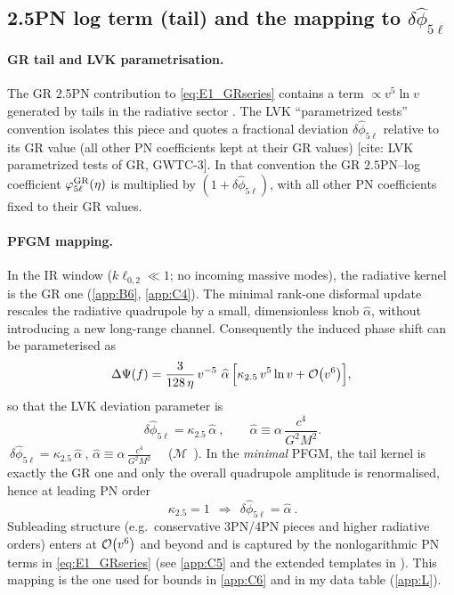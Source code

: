 \documentclass{iopjournal}
\begin{document}
\subsection{\texorpdfstring{2.5PN log term (tail) and the mapping to $\delta\hat\phi_{5\ell}$}{2.5PN log term (tail) and mapping to delta phihat 5 ell}}\label{app:E2}

\paragraph{GR tail and LVK parametrisation.}
The GR 2.5PN contribution to \eqref{eq:E1_GRseries} contains a term $\propto v^{5}\ln v$ generated by tails in the radiative sector \cite{Blanchet2014LRR}. The LVK ``parametrized tests'' convention isolates this piece and quotes a fractional deviation $\delta\hat\phi_{5\ell}$ relative to its GR value (all other PN coefficients kept at their GR values) [cite: LVK parametrized tests of GR, GWTC-3]. In that convention the GR $2.5$PN–log coefficient $\varphi_{5\ell}^{\rm GR}(\eta)$ is multiplied by $(1+\delta\hat\phi_{5\ell})$, with all other PN coefficients fixed to their GR values.

\paragraph{PFGM mapping.}
In the IR window ($k\ell_{0,2}\ll1$; no incoming massive modes), the radiative kernel is the GR one (\cref{app:B6}, \cref{app:C4}). The minimal rank-one disformal update rescales the radiative quadrupole by a small, dimensionless knob $\widehat\alpha$, without introducing a new long-range channel. Consequently the induced phase shift can be parameterised as
\begin{equation}
\Delta\Psi(f)=\frac{3}{128\,\eta}\,v^{-5}\ \widehat\alpha\,
\Big[\kappa_{2.5}\,v^{5}\ln v+\order{v^{6}}\Big],
\label{eq:E2_DeltaPsi}
\end{equation}
so that the LVK deviation parameter is
\begin{equation}
\boxed{\ \delta\hat\phi_{5\ell}=\kappa_{2.5}\,\widehat\alpha\ }\!,
\qquad
\widehat\alpha\equiv \alpha\,\frac{c^{4}}{G^{2}M^{2}}.
\label{eq:E2_map}
\end{equation}
$\boxed{\ \delta\hat\phi_{5\ell}=\kappa_{2.5}\,\widehat\alpha\ }\!$,
\qquad
$\widehat\alpha\equiv \alpha\,\frac{c^{4}}{G^{2}M^{2}}$
\ \ ($\mathcal{M}$\ ).
In the \emph{minimal} PFGM, the tail kernel is exactly the GR one and only the overall quadrupole amplitude is renormalised, hence at leading PN order
\begin{equation}
\boxed{\ \kappa_{2.5}=1\ \ \Rightarrow\ \ \delta\hat\phi_{5\ell}=\widehat\alpha\ } .
\label{eq:E2_kappa_one}
\end{equation}
Subleading structure (e.g.\ conservative 3PN/4PN pieces and higher radiative orders) enters at $\order{v^{6}}$ and beyond and is captured by the nonlogarithmic PN terms in \eqref{eq:E1_GRseries} (see \cref{app:C5} and the extended templates in ). This mapping is the one used for bounds in \cref{app:C6} and in my data table (\cref{app:L}). \cite{CutlerFlanagan1994,SathyaprakashSchutz2009,Blanchet2014LRR}
\end{document}

